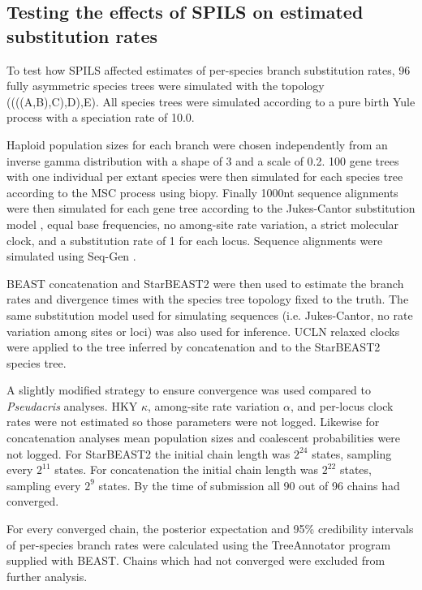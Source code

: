 \documentclass[12pt]{article}
\begin{document}
\subsection{Testing the effects of SPILS on estimated substitution rates}

To test how SPILS affected estimates of per-species branch substitution rates,
96 fully asymmetric species trees were simulated with the topology
((((A,B),C),D),E). All species trees were simulated according to a pure birth Yule
process \citep{Yule21} with a speciation rate of 10.0.

Haploid population sizes for each branch were chosen independently from an
inverse gamma distribution with a shape of 3 and a scale of 0.2. 100 gene trees
with one individual per extant species were then simulated for each species tree
according to the MSC process using biopy. Finally 1000nt sequence alignments
were then simulated for each gene tree according to the Jukes-Cantor
substitution model \citep{JUKES196921}, equal base frequencies, no among-site
rate variation, a strict molecular clock, and a substitution rate of 1 for each
locus. Sequence alignments were simulated using Seq-Gen \citep{Rambaut01061997}.

BEAST concatenation and StarBEAST2 were then used to estimate the branch rates
and divergence times with the species tree topology fixed to the truth. The same
substitution model used for simulating sequences (i.e. Jukes-Cantor, no rate
variation among sites or loci) was also used for inference. UCLN relaxed
clocks were applied to the tree inferred by concatenation and to the
StarBEAST2 species tree.

A slightly modified strategy to ensure convergence was used compared to
\textit{Pseudacris} analyses. HKY $\kappa$, among-site rate variation $\alpha$,
and per-locus clock rates were not estimated so those parameters were not
logged. Likewise for concatenation analyses mean population sizes and coalescent
probabilities were not logged. For StarBEAST2 the initial chain length was
$2^{24}$ states, sampling every $2^{11}$ states. For concatenation the initial
chain length was $2^{22}$ states, sampling every $2^{9}$ states. By the time of
submission all 90 out of 96 chains had converged.

For every converged chain, the posterior expectation and 95\% credibility
intervals of per-species branch rates were calculated using the TreeAnnotator
program supplied with BEAST. Chains which had not converged were excluded from
further analysis.
\end{document}

